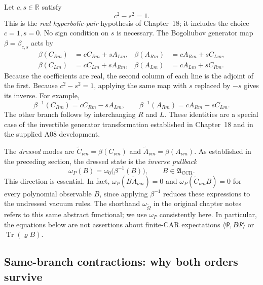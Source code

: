 Let $c,s\in\mathbb R$ satisfy
\begin{equation}
  c^2-s^2=1.
  \label{eq:ch19-hyperbolic-condition}
\end{equation}
This is the \emph{real hyperbolic-pair} hypothesis of Chapter~18; it
includes the choice $c=1,s=0$. No sign condition on $s$ is necessary.
The Bogoliubov generator map $\beta=\beta_{c,s}$ acts by
\begin{align}
 \beta(C_{Rm})&=cC_{Rm}+sA_{Lm},
 &\beta(A_{Rm})&=cA_{Rm}+sC_{Lm},\label{eq:ch19-beta-right}\\
 \beta(C_{Lm})&=cC_{Lm}+sA_{Rm},
 &\beta(A_{Lm})&=cA_{Lm}+sC_{Rm}.
 \label{eq:ch19-beta-left}
\end{align}
Because the coefficients are real, the second column of each line is
the adjoint of the first. Because $c^2-s^2=1$, applying the same map
with $s$ replaced by $-s$ gives its inverse. For example,
\[
 \beta^{-1}(C_{Rm})=cC_{Rm}-sA_{Lm},\qquad
 \beta^{-1}(A_{Rm})=cA_{Rm}-sC_{Lm}.
\]
The other branch follows by interchanging $R$ and $L$. These identities
are a special case of the invertible generator transformation established
in Chapter~18 and in the supplied A08 development.

The \emph{dressed} modes are $\widetilde C_{\nu m}=\beta(C_{\nu m})$
and $\widetilde A_{\nu m}=\beta(A_{\nu m})$. As established in the
preceding section, the dressed state is the \emph{inverse pullback}
\begin{equation}
  \omega_P(B)=\omega_0\bigl(\beta^{-1}(B)\bigr),
  \qquad B\in\mathfrak A_{\mathrm{CCR}}.
  \label{eq:ch19-pullback}
\end{equation}
This direction is essential. In fact,
$\omega_P(B\widetilde A_{\nu m})=0$ and
$\omega_P(\widetilde C_{\nu m}B)=0$ for every polynomial observable
$B$, since applying $\beta^{-1}$ reduces these expressions to the
undressed vacuum rules. The shorthand $\omega_{\widetilde\Omega}$ in
the original chapter notes refers to this same abstract functional;
we use $\omega_P$ consistently here. In particular, the equations below
are not assertions about finite-CAR expectations
$\langle\Psi,B\Psi\rangle$ or $\operatorname{Tr}(\varrho B)$.

\subsection{Same-branch contractions: why both orders survive}

